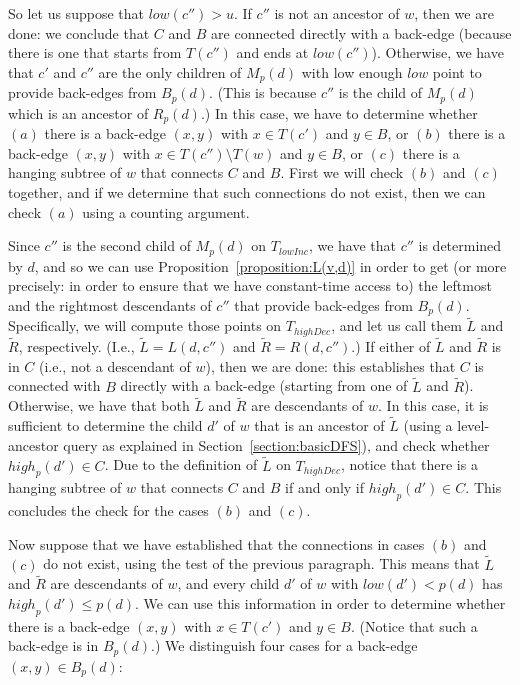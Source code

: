 \documentclass[11pt,a4paper]{article}
\begin{document}
So let us suppose that $\mathit{low}(c'')>u$. If $c''$ is not an ancestor of $w$, then we are done: we conclude that $C$ and $B$ are connected directly with a back-edge (because there is one that starts from $T(c'')$ and ends at $\mathit{low}(c'')$). Otherwise, we have that $c'$ and $c''$ are the only children of $M_p(d)$ with low enough $\mathit{low}$ point to provide back-edges from $B_p(d)$. (This is because $c''$ is the child of $M_p(d)$ which is an ancestor of $R_p(d)$.) In this case, we have to determine whether $(a)$ there is a back-edge $(x,y)$ with $x\in T(c')$ and $y\in B$, or $(b)$ there is a back-edge $(x,y)$ with $x\in T(c'')\setminus T(w)$ and $y\in B$, or $(c)$ there is a hanging subtree of $w$ that connects $C$ and $B$. First we will check $(b)$ and $(c)$ together, and if we determine that such connections do not exist, then we can check $(a)$ using a counting argument.

Since $c''$ is the second child of $M_p(d)$ on $T_\mathit{lowInc}$, we have that $c''$ is determined by $d$, and so we can use Proposition~\ref{proposition:L(v,d)} in order to get (or more precisely: in order to ensure that we have constant-time access to) the leftmost and the rightmost descendants of $c''$ that provide back-edges from $B_p(d)$. Specifically, we will compute those points on $T_\mathit{highDec}$, and let us call them $\widetilde{L}$ and $\widetilde{R}$, respectively. (I.e., $\widetilde{L}=L(d,c'')$ and $\widetilde{R}=R(d,c'')$.) If either of $\widetilde{L}$ and $\widetilde{R}$ is in $C$ (i.e., not a descendant of $w$), then we are done: this establishes that $C$ is connected with $B$ directly with a back-edge (starting from one of $\widetilde{L}$ and $\widetilde{R}$). Otherwise, we have that both $\widetilde{L}$ and $\widetilde{R}$ are descendants of $w$. In this case, it is sufficient to determine the child $d'$ of $w$ that is an ancestor of $\widetilde{L}$ (using a level-ancestor query as explained in Section~\ref{section:basicDFS}), and check whether $\mathit{high}_p(d')\in C$. Due to the definition of $\widetilde{L}$ on $T_\mathit{highDec}$, notice that there is a hanging subtree of $w$ that connects $C$ and $B$ if and only if $\mathit{high}_p(d')\in C$. This concludes the check for the cases $(b)$ and $(c)$.


Now suppose that we have established that the connections in cases $(b)$ and $(c)$ do not exist, using the test of the previous paragraph. This means that $\widetilde{L}$ and $\widetilde{R}$ are descendants of $w$, and every child $d'$ of $w$ with $\mathit{low}(d')<p(d)$ has $\mathit{high}_p(d')\leq p(d)$. We can use this information in order to determine whether there is a back-edge $(x,y)$ with $x\in T(c')$ and $y\in B$. (Notice that such a back-edge is in $B_p(d)$.) We distinguish four cases for a back-edge $(x,y)\in B_p(d)$:
\end{document}
